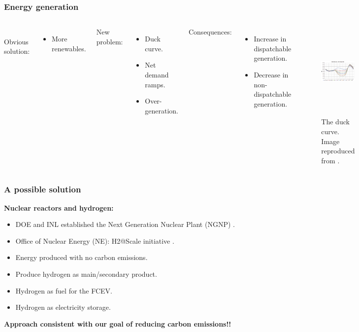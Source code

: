 \begin{frame}
\frametitle{Energy generation}
\begin{columns}
	\column[t]{4cm}
	\\
	Obvious solution:
	\begin{itemize}
		\item More renewables.
	\end{itemize}

    New problem:
	\begin{itemize}
		\item Duck curve.
		\item Net demand ramps.
		\item Over-generation.
	\end{itemize}

    Consequences:
	\begin{itemize}
		\item Increase in dispatchable generation.
		\item Decrease in non-dispatchable generation.
	\end{itemize}

    \column[t]{8cm}
	\begin{figure}[htbp!]
		\begin{center}
			\includegraphics[height=4.7cm]{images/caiso-duck.png}
		\end{center}
		\caption{The duck curve. Image reproduced from \cite{bouillon_prepared_2014}.}
	\end{figure}
\end{columns}
\end{frame}


\begin{frame}
\frametitle{A possible solution}
    \textbf{Nuclear reactors and hydrogen:}
    \begin{itemize}
    	\item DOE and INL established the Next Generation Nuclear Plant (NGNP) \cite{us_nrc_next_2017}.
		\item Office of Nuclear Energy (NE): H2@Scale initiative \cite{office_of_nuclear_energy_could_2018}.
		\item Energy produced with no carbon emissions.
		\item Produce hydrogen as main/secondary product.
		\item Hydrogen as fuel for the FCEV.
		\item Hydrogen as electricity storage.
	\end{itemize}

	\centering
	\vspace{0.7cm}
	\textbf{Approach consistent with our goal of reducing carbon emissions!!}
\end{frame}


